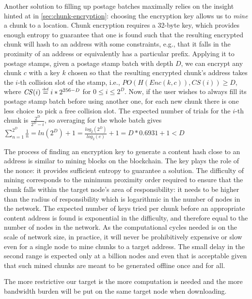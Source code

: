 Another solution to filling up postage batches maximally relies on the insight hinted at in \ref{sec:chunk-encryption}: choosing the encryption key allows us to \emph{mine} a chunk to a location. Chunk encryption requires a 32-byte key, which provides enough entropy to guarantee that one is found such that the resulting encrypted chunk will hash to an address with some constraints, e.g., that it falls in the proximity of an address or equivalently has a particular prefix. Applying it to postage stamps, given a postage stamp batch with depth $D$, we can encrypt any chunk $c$ with a key $k$ chosen so  that the resulting encrypted chunk's address takes the $i$-th collision slot of the stamp, i.e.,  $\mathit{PO}(\mathit{H}(\mathit{Enc}(k, c)), \mathit{CS}(i))\geq\mathit{D}$, where $\mathit{CS}(i)\overset{\textrm{\tiny def}}{=} i*2^{256-D}$ for $0\leq i\leq  2^D$. Now, if the user wishes to always fill its postage stamp batch before using another one, for each new chunk there is one less choice to pick a free collision slot. The expected number of trials for the $i$-th chunk is $\frac{2^D}{2^D-i}$, so averaging for the whole batch gives
$\sum_{n=1}^{2^D}\frac{1}{n}=\mathit{ln}(2^D)+1=\frac{\mathit{log}_2(2^D)}{\mathit{log}_2(e)}+1=D*0.6931+1<D$

The process of finding an encryption key to generate a content hash close to an address is similar to mining blocks on the blockchain. The key plays the role of the nonce: it provides sufficient entropy to guarantee a solution. The difficulty of mining corresponds to the minimum proximity order required to ensure that the chunk falls within the target node's area of responsibility: it needs to be higher than the radius of responsibility which is logarithmic in the number of nodes in the network. The expected number of keys tried per chunk before an appropriate content address is found is exponential in the difficulty, and therefore equal to the number of nodes in the network. As the computational cycles needed is on the scale of network size, in practice, it will never be prohibitively expensive or slow even for a single node to mine chunks to a target address. The small delay in the second range is expected only at a billion nodes and even that is acceptable given that such mined chunks are meant to be generated offline once and for all. 

The more restrictive our target is the more computation  is needed and the more bandwidth burden will be put on the same target node when downloading.


